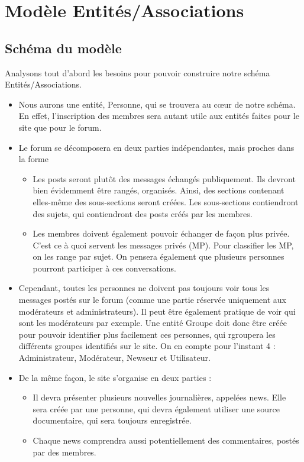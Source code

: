 \section{Modèle Entités/Associations}

\subsection{Schéma du modèle}
Analysons tout d'abord les besoins pour pouvoir construire notre schéma Entités/Associations.
\begin{itemize}
	\item Nous aurons une entité, Personne, qui se trouvera au c\oe ur de notre schéma. En effet, l'inscription des membres sera autant utile aux entités faites pour le site que pour le forum.
	\item Le forum se décomposera en deux parties indépendantes, mais proches dans la forme
		\begin{itemize}
			\item Les posts seront plutôt des messages échangés publiquement. Ils devront bien évidemment être rangés, organisés. Ainsi, des sections contenant elles-même des sous-sections seront créées. Les sous-sections contiendront des sujets, qui contiendront des posts créés par les membres.
			\item Les membres doivent également pouvoir échanger de façon plus privée. C'est ce à quoi servent les messages privés (MP). Pour classifier les MP, on les range par sujet. On pensera également que plusieurs personnes pourront participer à ces conversations.
		\end{itemize}
	\item Cependant, toutes les personnes ne doivent pas toujours voir tous les messages postés sur le forum (comme une partie réservée uniquement aux modérateurs et administrateurs). Il peut être également pratique de voir qui sont les modérateurs par exemple. Une entité Groupe doit donc être créée pour pouvoir identifier plus facilement ces personnes, qui rgroupera les différents groupes identifiés sur le site. On en compte pour l'instant 4 : Administrateur, Modérateur, Newseur et Utilisateur.
	\item De la même façon, le site s'organise en deux parties :
		\begin{itemize}
			\item Il devra présenter plusieurs nouvelles journalières, appelées news. Elle sera créée par une personne, qui devra également utiliser une source documentaire, qui sera toujours enregistrée. 
			\item Chaque news comprendra aussi potentiellement des commentaires, postés par des membres. 
		\end{itemize}
\end{itemize}

